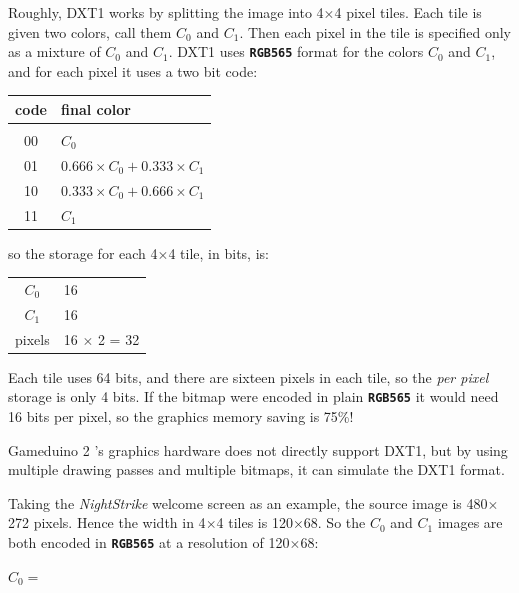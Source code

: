 \documentclass[10pt]{book}
\newcommand{\gdtwo}{Gameduino 2 }
\newcommand{\mach}[1]{\texttt{\textbf{#1}}}
\begin{document}
Roughly, DXT1 works by splitting the image into 4$\times$4 pixel tiles. Each tile is given two colors, call them
$C_0$ and $C_1$. Then each pixel in the tile is specified only as a mixture of $C_0$ and $C_1$.
DXT1 uses \mach{RGB565} format for the colors $C_0$ and $C_1$, and for each pixel it uses a two bit code:

\vspace{10pt}
\begin{tabular}{cl}
code & final color \\
\hline \\
00 & $C_0$ \\
01 & $0.666 \times C_0 + 0.333 \times C_1$ \\
10 & $0.333 \times C_0 + 0.666 \times C_1$ \\
11 & $C_1$ \\
\end{tabular}
\vspace{10pt}

\noindent
so the storage for each 4$\times$4 tile, in bits, is:

\vspace{10pt}
\begin{tabular}{cl}
$C_0$ & 16 \\
$C_1$ & 16 \\
pixels & 16 $\times$ 2 = 32 \\
\end{tabular}
\vspace{10pt}

Each tile uses 64 bits, and there are sixteen pixels in each tile, so the \textit{per pixel}
storage is only 4 bits. If the bitmap were encoded in plain \mach{RGB565} it would need 16 bits per pixel,
so the graphics memory saving is 75\%!

\gdtwo's graphics hardware does not directly support DXT1, but by using multiple drawing passes and multiple bitmaps, it can
simulate the DXT1 format.

\clearpage

Taking the \textit{NightStrike} welcome screen as an example, the source image is 480$\times$272 pixels.
Hence the width in 4$\times$4 tiles is 120$\times$68. So the $C_0$ and $C_1$ images are both encoded in \mach{RGB565} at a resolution of
120$\times$68:

\begin{center}
$C_0=$
\end{center}
\end{document}
